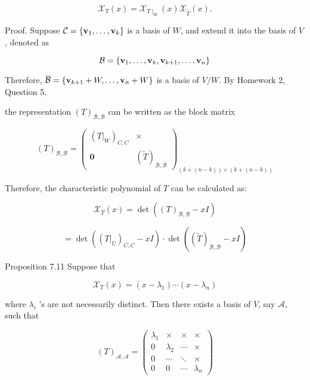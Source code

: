\documentclass[11pt]{article}
\begin{document}
\[
{\mathcal{X}}_{T}\left( x\right)  = {\mathcal{X}}_{T{ \mid  }_{W}}\left( x\right) {\mathcal{X}}_{\widetilde{T}}\left( x\right) .
\]

Proof. Suppose \(\mathcal{C} = \left\{  {{\bf v}_1,\ldots ,{\bf v}_{k}}\right\}\) is a basis of \(W\), and extend it into the basis of \(V\), denoted as

\[
\mathcal{B} = \left\{  {{\bf v}_1,\ldots ,{\bf v}_{k},{\bf v}_{k + 1},\ldots ,{\bf v}_n}\right\}
\]

Therefore, \(\overline{\mathcal{B}} = \left\{  {{\bf v}_{k + 1} + W,\ldots ,{\bf v}_n + W}\right\}\) is a basis of \(V/W\). By Homework 2, Question 5,

the representation \({\left( T\right) }_{\mathcal{B},\mathcal{B}}\) can be written as the block matrix

\[
{\left( T\right) }_{\mathcal{B},\mathcal{B}} = {\left( \begin{matrix} {\left( {\left. T\right| }_{W}\right) }_{C,C} &  \times  \\  \mathbf{0} & {\left( \widetilde{T}\right) }_{\overline{\mathcal{B}},\overline{\mathcal{B}}} \end{matrix}\right) }_{\left( {k + \left( {n - k}\right) }\right)  \times  \left( {k + \left( {n - k}\right) }\right) }
\]

Therefore, the characteristic polynomial of \(T\) can be calculated as:

\[
{\mathcal{X}}_{T}\left( x\right)  = \det \left( {{\left( T\right) }_{\mathcal{B},\mathcal{B}} - {xI}}\right)
\]

\[
= \det \left( {{\left( {\left. T\right| }_{U}\right) }_{C,C} - {xI}}\right)  \cdot  \det \left( {{\left( \widetilde{T}\right) }_{\overline{\mathcal{B}},\overline{\mathcal{B}}} - {xI}}\right)
\]

Proposition 7.11 Suppose that

\[
{\mathcal{X}}_{T}\left( x\right)  = \left( {x - {\lambda }_1}\right) \cdots \left( {x - {\lambda }_n}\right)
\]

where \({\lambda }_{i}\) ’s are not necessarily distinct. Then there exists a basis of \(V\), say \(\mathcal{A}\), such that

\[
{\left( T\right) }_{\mathcal{A},\mathcal{A}} = \left( \begin{matrix} {\lambda }_1 &  \times  &  \times  &  \times  \\  0 & {\lambda }_2 & \cdots &  \times  \\  0 & \cdots &  \ddots  &  \times  \\  0 & 0 & \cdots & {\lambda }_n \end{matrix}\right)
\]
\end{document}
